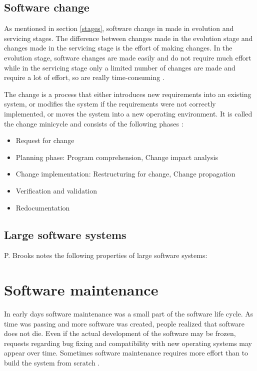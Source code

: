 \documentclass[12pt]{mitthesis}
\begin{document}
\subsection{Software change}
As mentioned in section \ref{stages}, software change in made in evolution and servicing stages. The difference between changes made in the evolution stage and changes made in the servicing stage is the effort of making changes. In the evolution stage, software changes are made easily and do not require much effort while in the servicing stage only a limited number of changes are made and require a lot of effort, so are really time-consuming \cite{Bennett}.

The change is a process that either introduces new requirements into an existing
system, or modifies the system if the requirements were not correctly implemented, or
moves the system into a new operating environment. It is called the change minicycle \cite{810308} and consists of the following phases :
\begin{itemize}
\item Request for change
\item Planning phase: Program comprehension, Change impact analysis
\item Change implementation: Restructuring for change, Change propagation
\item Verification and validation
\item Redocumentation
\end{itemize}

\subsection{Large software systems}
P. Brooks \cite{Brooks:1987:NSB:26440.26441} notes the following properties of large software systems:
\cite{nsbreloaded}

\section{Software maintenance}
In early days software maintenance was a small part of the software life cycle. As time was passing and more software was created, people realized that software does not die. Even if the actual development of the software may be frozen, requests regarding bug fixing and compatibility with new operating systems may appear over time. Sometimes software maintenance requires more effort than to build the system from scratch \cite{Yang:2003:SES:599790}.
\end{document}
